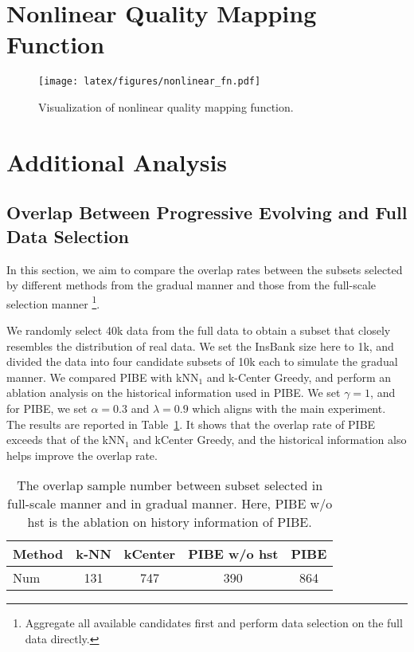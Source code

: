 \section{Nonlinear Quality Mapping Function}

\begin{figure}[hbtp]
\texttt{[image: latex/figures/nonlinear\_fn.pdf]}
\caption{Visualization of nonlinear quality mapping function.}
\label{fig: nonlinear_fn}
\end{figure}


\section{Additional Analysis}
\label{appendix: addition-analysis}

\subsection{Overlap Between Progressive Evolving and Full Data Selection}
\label{appendix: overlap-between-progressive-and-full}

In this section, we aim to compare the overlap rates between the subsets selected by different methods from the gradual manner and those from the full-scale selection manner \footnote{Aggregate all available candidates first and perform data selection on the full data directly.}. 

We randomly select 40k data from the full data to obtain a subset that closely resembles the distribution of real data. We set the InsBank size here to 1k, and divided the data into four candidate subsets of 10k each to simulate the gradual manner. We compared PIBE with kNN$_1$ and k-Center Greedy, and perform an ablation analysis on the historical information used in PIBE. We set $\gamma=1$, and for PIBE, we set $\alpha=0.3$ and $\lambda=0.9$ which aligns with the main experiment. The results are reported in Table~\ref{tab: result-overlap}. It shows that the overlap rate of PIBE exceeds that of the kNN$_1$ and kCenter Greedy, and the historical information also helps improve the overlap rate. 

\begin{table}[htbp]
    \centering
    \small
    \begin{tabular}{lcccc}
    \toprule
    Method  & k-NN & kCenter & PIBE w/o hst & PIBE \\  
    \midrule
    Num & 131 & 747 & 390 & 864 \\
    \bottomrule
    \end{tabular}
    \caption{The overlap sample number between subset selected in full-scale manner and in gradual manner. Here, PIBE w/o hst is the ablation on history information of PIBE.}
    \label{tab: result-overlap}
\end{table}

